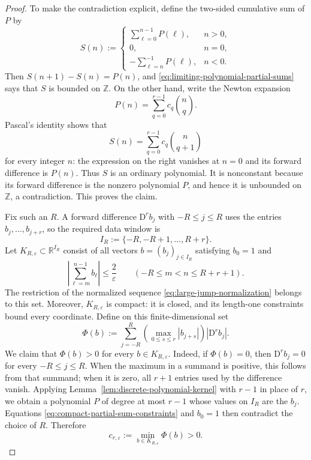 \documentclass[11pt]{amsart}
\theoremstyle{plain}
\theoremstyle{definition}
\theoremstyle{remark}
\numberwithin{equation}{section}
\theoremstyle{plain}
\begin{document}
\begin{proof}
	To make the contradiction explicit, define the two-sided cumulative
	sum of $P$ by
	\begin{equation}\label{eq:two-sided-polynomial-primitive}
		S(n):=
		\begin{cases}
			\displaystyle\sum_{\ell=0}^{n-1}P(\ell),&n>0,\\[2mm]
			0,&n=0,\\[2mm]
			\displaystyle-\sum_{\ell=n}^{-1}P(\ell),&n<0.
		\end{cases}
	\end{equation}
	Then $S(n+1)-S(n)=P(n)$, and
	\eqref{eq:limiting-polynomial-partial-sums} says that $S$ is bounded on
	$\mathbb Z$.  On the other hand, write the Newton expansion
	\[
	P(n)=\sum_{q=0}^{r-1}c_q\binom nq.
	\]
	Pascal's identity shows that
	\begin{equation}\label{eq:newton-polynomial-primitive}
		S(n)=\sum_{q=0}^{r-1}c_q\binom n{q+1}
	\end{equation}
	for every integer $n$: the expression on the right vanishes at $n=0$ and
	its forward difference is $P(n)$.  Thus $S$ is an ordinary polynomial.  It is
	nonconstant because its forward difference is the nonzero polynomial $P$,
	and hence it is unbounded on $\mathbb Z$, a contradiction.  This proves the
	claim.
	
	Fix such an $R$.  A forward difference $\mathrm D^rb_j$ with
	$-R\le j\le R$ uses the entries $b_j,\ldots,b_{j+r}$, so the required data
	window is
	\begin{equation}\label{eq:large-jump-data-window}
		I_R:=\{-R,-R+1,\ldots,R+r\}.
	\end{equation}
	Let $K_{R,\varepsilon}\subset\mathbb R^{I_R}$ consist of all vectors
	$b=(b_j)_{j\in I_R}$ satisfying $b_0=1$ and
	\begin{equation}\label{eq:compact-partial-sum-constraints}
		\left|\sum_{\ell=m}^{n-1}b_\ell\right|
		\le\frac{2}{\varepsilon}
		\qquad
		(-R\le m<n\le R+r+1).
	\end{equation}
	The restriction of the normalized sequence
	\eqref{eq:large-jump-normalization} belongs to this set.  Moreover,
	$K_{R,\varepsilon}$ is compact: it is closed, and its length-one constraints
	bound every coordinate.  Define on this finite-dimensional set
	\begin{equation}\label{eq:normalized-local-source}
		\Phi(b):=\sum_{j=-R}^{R}
		\left(\max_{0\le s\le r}|b_{j+s}|\right)
		|\mathrm D^rb_j|.
	\end{equation}
	We claim that $\Phi(b)>0$ for every $b\in K_{R,\varepsilon}$.  Indeed,
	if $\Phi(b)=0$, then
	$\mathrm D^rb_j=0$ for every $-R\le j\le R$.  When the maximum in a
	summand is positive, this follows from that summand; when it is zero, all
	$r+1$ entries used by the difference vanish.  Applying
	Lemma~\ref{lem:discrete-polynomial-kernel} with $r-1$ in place of $r$,
	we obtain a polynomial $P$ of degree at most $r-1$ whose values on $I_R$
	are the $b_j$.  Equations
	\eqref{eq:compact-partial-sum-constraints} and $b_0=1$ then contradict the
	choice of $R$.  Therefore
	\begin{equation}\label{eq:positive-local-source-minimum}
		c_{r,\varepsilon}
		:=\min_{b\in K_{R,\varepsilon}}\Phi(b)>0.
	\end{equation}
	

\end{proof}
\end{document}
